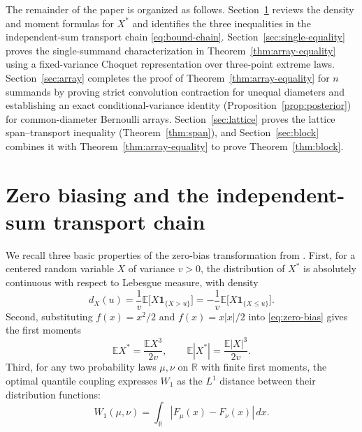 \documentclass[11pt]{article}
\numberwithin{equation}{section}
\theoremstyle{remark}
\newcommand{\E}{\mathbb E}
\newcommand{\R}{\mathbb R}
\begin{document}
The remainder of the paper is organized as follows. Section~\ref{sec:basic}
reviews the density and moment formulas for $X^*$ and identifies the three
inequalities in the independent-sum transport chain \eqref{eq:bound-chain}.
Section~\ref{sec:single-equality} proves the single-summand characterization
in Theorem~\ref{thm:array-equality} using a fixed-variance Choquet
representation over three-point extreme laws. Section~\ref{sec:array}
completes the proof of Theorem~\ref{thm:array-equality} for $n$ summands by
proving strict convolution contraction for unequal diameters and establishing
an exact conditional-variance identity (Proposition~\ref{prop:posterior}) for
common-diameter Bernoulli arrays. Section~\ref{sec:lattice} proves the
lattice span--transport inequality (Theorem~\ref{thm:span}), and
Section~\ref{sec:block} combines it with Theorem~\ref{thm:array-equality} to
prove Theorem~\ref{thm:block}.

\section{Zero biasing and the independent-sum transport chain}\label{sec:basic}

We recall three basic properties of the zero-bias transformation from
\citet[Lemma~2.1]{GoldsteinReinert1997}. First, for a centered random variable
$X$ of variance $v>0$, the distribution of $X^*$ is absolutely continuous
with respect to Lebesgue measure, with density
\begin{equation}\label{eq:density}
             d_X(u)=\frac1v\E\bigl[X\mathbf1_{\{X>u\}}\bigr]
                   =-\frac1v\E\bigl[X\mathbf1_{\{X\le u\}}\bigr].
\end{equation}
Second, substituting $f(x)=x^2/2$ and $f(x)=x|x|/2$ into \eqref{eq:zero-bias}
gives the first moments
\begin{equation}\label{eq:bias-moments}
 \E X^*=\frac{\E X^3}{2v},\qquad
 \E|X^*|=\frac{\E|X|^3}{2v}.
\end{equation}
Third, for any two probability laws $\mu,\nu$ on $\R$ with finite first
moments, the optimal quantile coupling \citep[eqs.~(15)--(16)]{Goldstein2010}
expresses $W_1$ as the $L^1$ distance between their distribution functions:
\begin{equation}\label{eq:cdf-distance}
       W_1(\mu,\nu)=\int_\R|F_\mu(x)-F_\nu(x)|\,dx.
\end{equation}
\end{document}
